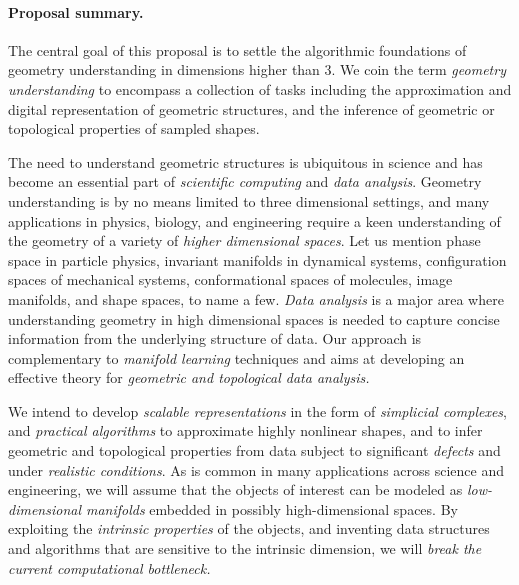 
\paragraph{Proposal summary.} 

The central goal of this proposal is to settle the algorithmic
foundations of geometry understanding in dimensions higher than 3.  We
coin the term {\em geometry understanding} to encompass a collection
of tasks including the approximation and digital representation
of geometric structures, and the inference of geometric or topological
properties of sampled
shapes.  

The need to understand geometric structures is ubiquitous in science
and has become an essential part of {\em scientific computing} and
{\em data analysis}. 
Geometry understanding is by no means limited to
three dimensional settings, and many applications in physics, biology, and
engineering require a keen understanding of the geometry of a variety
of {\em higher dimensional spaces}. Let us mention phase space in particle
physics, invariant manifolds in dynamical systems, configuration
spaces of mechanical systems, conformational spaces of molecules,
image manifolds, and shape spaces, to name a few.  {\em Data
  analysis} is a major area where understanding
geometry in high dimensional spaces is  needed to
 capture concise information from the underlying structure of
 data. Our approach is complementary to {\em manifold learning}
 techniques and aims at  developing an effective theory for {\em geometric and
 topological data analysis.}

We intend to develop {\em scalable representations} in the form of
{\em simplicial complexes}, and {\em practical algorithms} to
approximate highly nonlinear shapes, and to infer geometric and
topological properties from data subject to significant {\em defects}
and under {\em realistic conditions}.  As is common in many
applications across science and engineering, we will assume that the
objects of interest can be modeled as {\em low-dimensional manifolds}
embedded in possibly high-dimensional spaces.  By exploiting the {\em
  intrinsic properties} of the objects, and inventing data structures
and algorithms that are sensitive to the intrinsic dimension, we
will {\em break the current computational bottleneck.}

